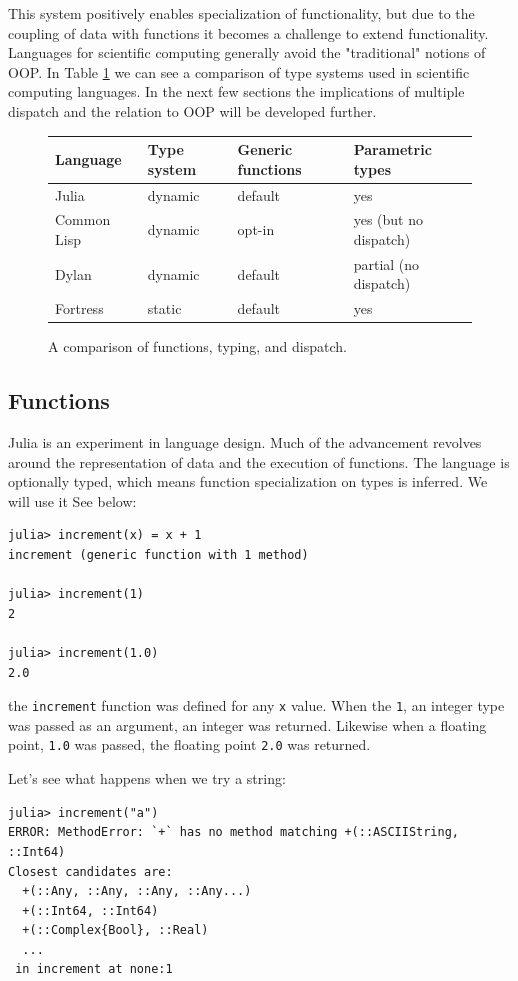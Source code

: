 \documentclass[a4paper]{article}
\begin{document}
This system positively enables specialization of functionality, but due
to the coupling of data with functions it becomes a challenge to extend
functionality. Languages for scientific computing generally avoid the
"traditional" notions
of OOP. In Table \ref{tab:types} we can see a
comparison of type systems used in scientific computing languages. In the next
few sections the implications of multiple dispatch and the relation to OOP
will be developed further.


\begin{figure}[h!]
  \centering
    \caption{A comparison of functions, typing, and dispatch.}
    \begin{tabular}{ l | l l l}
    Language & Type system & Generic functions & Parametric types \\
    \hline
    Julia & dynamic & default & yes \\
    Common Lisp & dynamic & opt-in & yes (but no dispatch) \\
    Dylan & dynamic & default & partial (no dispatch) \\
    Fortress & static & default & yes \\
    \end{tabular}
  \label{tab:types}
\end{figure}


\subsection{Functions}
Julia is an experiment in language design. Much of the advancement
revolves around the representation of data and the execution of functions.
The language is optionally typed, which means function specialization on types
is inferred. We will use it See below:
\begin{lstlisting}
julia> increment(x) = x + 1
increment (generic function with 1 method)

julia> increment(1)
2

julia> increment(1.0)
2.0
\end{lstlisting}
the \texttt{increment} function was defined for any \texttt{x} value. When the
\texttt{1}, an
integer type was passed as an argument, an integer was returned. Likewise
when a floating point, \texttt{1.0} was passed, the floating point
\texttt{2.0} was returned.

Let's see what happens when we try a string:
\begin{lstlisting}
julia> increment("a")
ERROR: MethodError: `+` has no method matching +(::ASCIIString, ::Int64)
Closest candidates are:
  +(::Any, ::Any, ::Any, ::Any...)
  +(::Int64, ::Int64)
  +(::Complex{Bool}, ::Real)
  ...
 in increment at none:1
\end{lstlisting}
\end{document}
